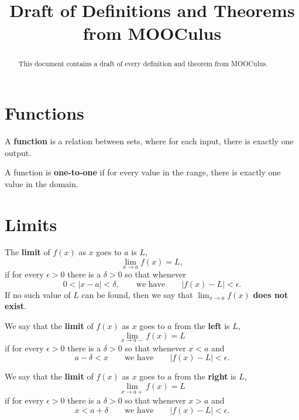 \documentclass{ximera}
\title{Draft of Definitions and Theorems from MOOCulus}
\begin{document}
\begin{abstract}
This document contains a draft of every definition and theorem from
MOOCulus.
\end{abstract}
\maketitle


\section*{Functions}

\begin{definition}
A \textbf{function} is a relation between sets, where for each input,
there is exactly one output.
\end{definition}

\begin{definition}
A function is \textbf{one-to-one} if for every value in the range,
there is exactly one value in the domain.
\end{definition}




\section*{Limits}

\begin{definition}
The \textbf{limit} of $f(x)$ as $x$ goes to $a$ is $L$,
\[
\lim_{x\to a}f(x)=L,
\] 
if for every $\epsilon>0$ there is a $\delta > 0$ so that whenever
\[
0 < |x-a| < \delta, \qquad\text{we have} \qquad |f(x)-L|<\epsilon.
\] 
If no such value of $L$ can be
found, then we say that $\lim_{x\to a}f(x)$ \textbf{does not exist}.
\end{definition}



\begin{definition} 
We say that the \textbf{limit} of $f(x)$ as $x$ goes to $a$ from the
\textbf{left} is $L$,
\[
\lim_{x\to a-}f(x)=L
\]
if for every $\epsilon>0$ there is a $\delta > 0$ so that whenever $x< a$ and 
\[
a-\delta < x \qquad\text{we have}\qquad |f(x)-L|<\epsilon.
\]

We say that the \textbf{limit} of $f(x)$ as $x$ goes to $a$ from the \textbf{right} is $L$,
\[
\lim_{x\to a+}f(x)=L
\] 
if for every $\epsilon>0$ there is a $\delta > 0$ so that whenever $x > a$ and 
\[
x<a+\delta \qquad\text{we have}\qquad |f(x)-L|<\epsilon.
\]
\end{definition}
\end{document}
